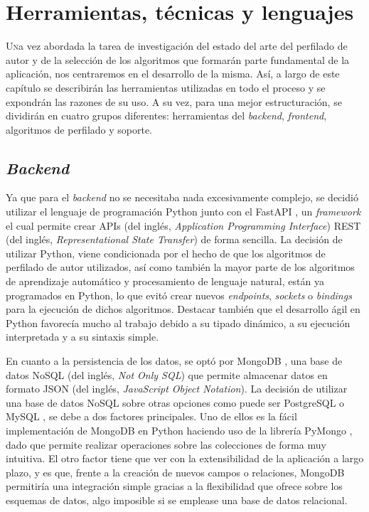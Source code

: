 \chapter{Herramientas, técnicas y lenguajes}
\label{chap:herramientas}

\lettrine{U}na vez abordada la tarea de investigación del estado del arte del perfilado de autor y de la selección
de los algoritmos que formarán parte fundamental de la aplicación, nos centraremos
en el desarrollo de la misma.
Así, a largo de este capítulo se describirán las herramientas utilizadas en todo el proceso y se expondrán las
razones de su uso. A su vez, para una mejor estructuración, se dividirán en cuatro grupos diferentes:
herramientas del \textit{backend}, \textit{frontend}, algoritmos de perfilado y soporte.

\section{\textit{Backend}}
\label{sec:herramientas_backend}

Ya que para el \textit{backend} no se necesitaba nada excesivamente complejo, se decidió utilizar el lenguaje de programación Python \cite{python} junto
con el FastAPI \cite{fastapi}, un \textit{framework} el cual permite crear APIs (del inglés, \textit{Application Programming Interface})
REST (del inglés, \textit{Representational State Transfer}) de forma sencilla. La decisión de utilizar Python, viene
condicionada por el hecho de que los algoritmos de perfilado de autor utilizados, así como también la mayor parte de los algoritmos de aprendizaje automático
y procesamiento de lenguaje natural,
están ya programados en Python, lo que evitó crear nuevos \textit{endpoints}, \textit{sockets} o \textit{bindings} para la ejecución de dichos algoritmos.
Destacar también que el desarrollo ágil en Python favorecía mucho al trabajo debido a su tipado dinámico, a su ejecución interpretada y a su sintaxis simple.

\bigskip
En cuanto a la persistencia de los datos, se optó por MongoDB \cite{mongodb}, una base de datos NoSQL (del inglés, \textit{Not Only SQL}) que permite almacenar
datos en formato JSON (del inglés, \textit{JavaScript Object Notation}). La decisión de utilizar una base de datos NoSQL sobre otras opciones como puede ser
PostgreSQL \cite{postgresql} o MySQL \cite{mysql}, se debe a dos factores principales. Uno de ellos es la fácil implementación de MongoDB en Python
haciendo uso de la librería PyMongo \cite{pymongo}, dado que permite realizar operaciones sobre las colecciones de forma muy intuitiva.
El otro factor tiene que ver con la extensibilidad de la aplicación a largo plazo, y es que, frente a la creación de nuevos
campos o relaciones, MongoDB permitiría una integración simple gracias a la flexibilidad que ofrece sobre los esquemas de datos, algo imposible
si se emplease una base de datos relacional.


